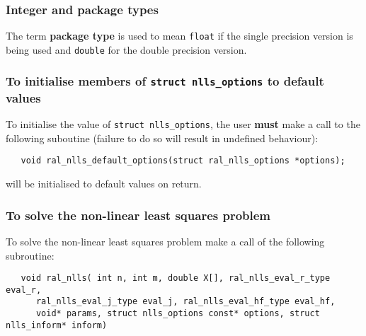 \documentclass{spec}
\begin{document}
\hslarguments

\subsubsection{Integer and package types}
The term {\bf package type} is used to mean \texttt{float}
if the single precision version is being used and
\texttt{double} for the double precision version.

\subsubsection{To initialise members of \texttt{struct nlls\_options} to default values}

To initialise the value of \texttt{struct nlls\_options}, the user \textbf{must} make a
call to the following suboutine (failure to do so will result in undefined behaviour):
\begin{verbatim}
   void ral_nlls_default_options(struct ral_nlls_options *options);
\end{verbatim}

\begin{description}
    will be initialised to default values on return.
\end{description}

\subsubsection{To solve the non-linear least squares problem}
\label{sec:solve}

To solve the non-linear least squares problem make a call of the following
subroutine:

\begin{verbatim}
   void ral_nlls( int n, int m, double X[], ral_nlls_eval_r_type eval_r,
      ral_nlls_eval_j_type eval_j, ral_nlls_eval_hf_type eval_hf,
      void* params, struct nlls_options const* options, struct nlls_inform* inform)
\end{verbatim}
\end{document}
